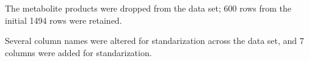 \documentclass[
]{article}
\newenvironment{Shaded}{\begin{snugshade}}{\end{snugshade}}
\newcommand{\CommentTok}[1]{\textcolor[rgb]{0.56,0.35,0.01}{\textit{#1}}}
\newcommand{\KeywordTok}[1]{\textcolor[rgb]{0.13,0.29,0.53}{\textbf{#1}}}
\newcommand{\NormalTok}[1]{#1}
\newcommand{\OperatorTok}[1]{\textcolor[rgb]{0.81,0.36,0.00}{\textbf{#1}}}
\newcommand{\StringTok}[1]{\textcolor[rgb]{0.31,0.60,0.02}{#1}}
\begin{document}
The metabolite products were dropped from the data set; 600 rows from
the initial 1494 rows were retained.

\begin{Shaded}
\end{Shaded}

Several column names were altered for standarization across the data
set, and 7 columns were added for standarization.
\end{document}
